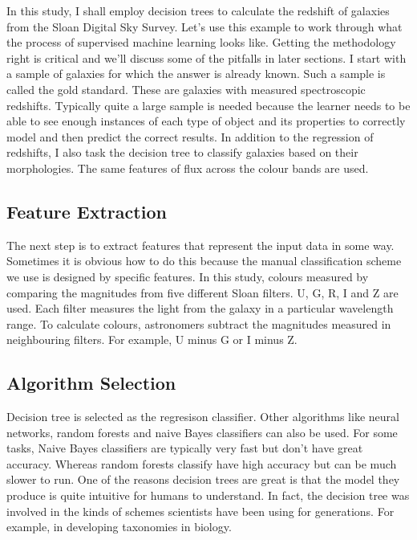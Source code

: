 In this study, I shall employ decision trees to calculate the redshift of galaxies from the Sloan Digital Sky Survey. Let's use this example to work through what the process of supervised machine learning looks like. Getting the methodology right is critical and we'll discuss some of the pitfalls in later sections. I start with a sample of galaxies for which the answer is already known. Such a sample is called the gold standard. These are galaxies with measured spectroscopic redshifts. Typically quite a large sample is needed because the learner needs to be able to see enough instances of each type of object and its properties to correctly model and then predict the correct results. In addition to the regression of redshifts, I also task the decision tree to classify galaxies based on their morphologies. The same features of flux across the colour bands are used.

\subsection{Feature Extraction}
The next step is to extract features that represent the input data in some way. Sometimes it is obvious how to do this because the manual classification scheme we use is designed by specific features. In this study, colours measured by comparing the magnitudes from five different Sloan filters. U, G, R, I and Z are used. Each filter measures the light from the galaxy in a particular wavelength range. To calculate colours, astronomers subtract the magnitudes measured in neighbouring filters. For example, U minus G or I minus Z.

\subsection{Algorithm Selection}
Decision tree is selected as the regresison classifier. Other algorithms like neural networks, random forests and naive Bayes classifiers can also be used. For some tasks, Naive Bayes classifiers are typically very fast but don't have great accuracy. Whereas random forests classify have high accuracy but can be much slower to run. One of the reasons decision trees are great is that the model they produce is quite intuitive for humans to understand. In fact, the decision tree was involved in the kinds of schemes scientists have been using for generations. For example, in developing taxonomies in biology.


